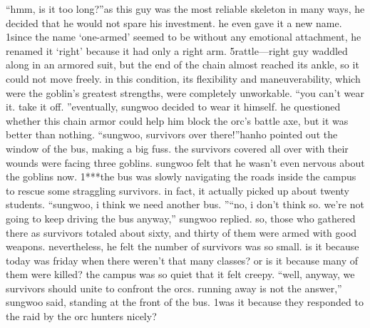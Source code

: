 “hmm, is it too long?”as this guy was the most reliable skeleton in many ways, he decided that he would not spare his investment.
 he even gave it a new name.
1since the name ‘one-armed’ seemed to be without any emotional attachment, he renamed it ‘right’ because it had only a right arm.
5rattle—right guy waddled along in an armored suit, but the end of the chain almost reached its ankle, so it could not move freely.
 in this condition, its flexibility and maneuverability, which were the goblin’s greatest strengths, were completely unworkable.
“you can’t wear it.
 take it off.
”eventually, sungwoo decided to wear it himself.
 he questioned whether this chain armor could help him block the orc’s battle axe, but it was better than nothing.
“sungwoo, survivors over there!”hanho pointed out the window of the bus, making a big fuss.
 the survivors covered all over with their wounds were facing three goblins.
sungwoo felt that he wasn’t even nervous about the goblins now.
1***the bus was slowly navigating the roads inside the campus to rescue some straggling survivors.
 in fact, it actually picked up about twenty students.
“sungwoo, i think we need another bus.
”“no, i don’t think so.
 we’re not going to keep driving the bus anyway,” sungwoo replied.
so, those who gathered there as survivors totaled about sixty, and thirty of them were armed with good weapons.
nevertheless, he felt the number of survivors was so small.
 is it because today was friday when there weren’t that many classes? or is it because many of them were killed? the campus was so quiet that it felt creepy.
“well, anyway, we survivors should unite to confront the orcs.
 running away is not the answer,” sungwoo said, standing at the front of the bus.
1was it because they responded to the raid by the orc hunters nicely?

 